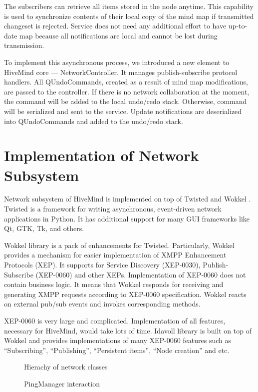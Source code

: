 The subscribers can retrieve all items stored in the node anytime. This
capability is used to synchronize contents of their local copy of the mind map
if transmitted changeset is rejected. Service does not need any additional
effort to have up-to-date map because all notifications are local and cannot be
lost during transmission.

To implement this asynchronous process, we introduced a new element to HiveMind
core --- NetworkController. It manages publish-subscribe protocol handlers. All
QUndoCommands, created as a result of mind map modifications, are passed to the
controller. If there is no network collaboration at the moment, the command will
be added to the local undo/redo stack. Otherwise, command will be serialized and
sent to the service. Update notifications are deserialized into QUndoCommands
and added to the undo/redo stack.


\section{Implementation of Network Subsystem}

Network subsystem of HiveMind is implemented on top of Twisted \cite{twisted} and
Wokkel \cite{wokkel}. Twisted is a framework for writing asynchronous,
event-driven network applications in Python. It has additional support for many
GUI frameworks like Qt, GTK, Tk, and others.

Wokkel library is a pack of enhancements for Twisted. Particularly, Wokkel
provides a mechanism for easier implementation of XMPP Enhancement Protocols
(XEP). It supports for Service Discovery (XEP-0030), Publish-Subscribe
(XEP-0060) and other XEPs. Implementation of XEP-0060 does not contain business
logic. It means that Wokkel responds for receiving and generating XMPP requests
according to XEP-0060 specification. Wokkel reacts on external pub/sub events
and invokes corresponding methods.

XEP-0060 is very large and complicated. Implementation of all features,
necessary for HiveMind, would take lots of time. Idavoll library is built on top
of Wokkel and provides implementations of many XEP-0060 features such as
``Subscribing'', ``Publishing'', ``Persistent items'', ``Node creation'' and
etc.

\begin{figure}
\begin{minipage}[t]{0.65\linewidth}
  \caption{Hierachy of network classes}
  \label{Network classes}
\end{minipage}
\hfill
\begin{minipage}[t]{0.35\linewidth}
  \caption{PingManager interaction}
  \label{Ping manager}
\end{minipage}
\end{figure}

